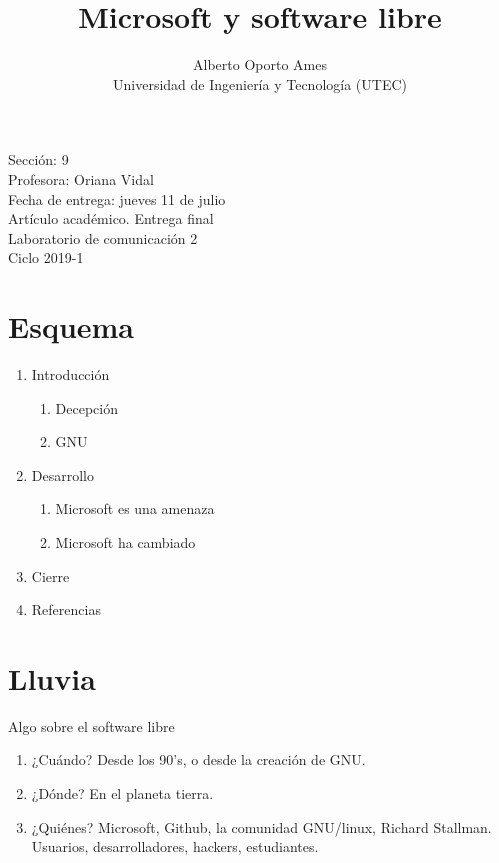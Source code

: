 \documentclass[12pt, twoside]{article}
\title{\textbf{Microsoft y software libre}}
\date{}
\author{
		Alberto Oporto Ames\\
		Universidad de Ingeniería y Tecnología (UTEC)
		}
\begin{document}
\maketitle
\vfill

\noindent Sección: 9\\
Profesora: Oriana Vidal\\
Fecha de entrega: jueves 11 de julio\bigskip\bigskip\\
Artículo académico. Entrega final\\
Laboratorio de comunicación 2\\
Ciclo 2019-1

\thispagestyle{fancy}
\newpage
\section*{Esquema}%

\begin{enumerate}
	\item Introducción
		\begin{enumerate}
			\item Decepción
			\item GNU
		\end{enumerate}
	\item Desarrollo
		\begin{enumerate}
			\item Microsoft es una amenaza
			\item Microsoft ha cambiado
		\end{enumerate}
	\item Cierre
	\item Referencias
\end{enumerate}
\newpage
\iffalse
\section{Lluvia}
\label{sec:Lluvia}

Algo sobre el software libre

\begin{enumerate}
	\item ¿Cuándo?
		\subitem Desde los 90's, o desde la creación de GNU.
	\item ¿Dónde?
		\subitem En el planeta tierra.
	\item ¿Quiénes?
		\subitem Microsoft, Github, la comunidad GNU/linux, Richard Stallman.
		\subitem Usuarios, desarrolladores, hackers, estudiantes.
\end{enumerate}
\end{document}
